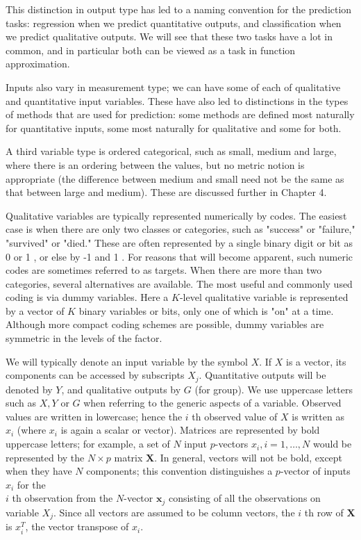 \documentclass[10pt]{article}
\begin{document}
This distinction in output type has led to a naming convention for the prediction tasks: regression when we predict quantitative outputs, and classification when we predict qualitative outputs. We will see that these two tasks have a lot in common, and in particular both can be viewed as a task in function approximation.

Inputs also vary in measurement type; we can have some of each of qualitative and quantitative input variables. These have also led to distinctions in the types of methods that are used for prediction: some methods are defined most naturally for quantitative inputs, some most naturally for qualitative and some for both.

A third variable type is ordered categorical, such as small, medium and large, where there is an ordering between the values, but no metric notion is appropriate (the difference between medium and small need not be the same as that between large and medium). These are discussed further in Chapter 4.

Qualitative variables are typically represented numerically by codes. The easiest case is when there are only two classes or categories, such as "success" or "failure," "survived" or "died." These are often represented by a single binary digit or bit as 0 or 1 , or else by -1 and 1 . For reasons that will become apparent, such numeric codes are sometimes referred to as targets. When there are more than two categories, several alternatives are available. The most useful and commonly used coding is via dummy variables. Here a $K$-level qualitative variable is represented by a vector of $K$ binary variables or bits, only one of which is "on" at a time. Although more compact coding schemes are possible, dummy variables are symmetric in the levels of the factor.

We will typically denote an input variable by the symbol $X$. If $X$ is a vector, its components can be accessed by subscripts $X_{j}$. Quantitative outputs will be denoted by $Y$, and qualitative outputs by $G$ (for group). We use uppercase letters such as $X, Y$ or $G$ when referring to the generic aspects of a variable. Observed values are written in lowercase; hence the $i$ th observed value of $X$ is written as $x_{i}$ (where $x_{i}$ is again a scalar or vector). Matrices are represented by bold uppercase letters; for example, a set of $N$ input $p$-vectors $x_{i}, i=1, \ldots, N$ would be represented by the $N \times p$ matrix $\mathbf{X}$. In general, vectors will not be bold, except when they have $N$ components; this convention distinguishes a $p$-vector of inputs $x_{i}$ for the\\
$i$ th observation from the $N$-vector $\mathbf{x}_{j}$ consisting of all the observations on variable $X_{j}$. Since all vectors are assumed to be column vectors, the $i$ th row of $\mathbf{X}$ is $x_{i}^{T}$, the vector transpose of $x_{i}$.
\end{document}
